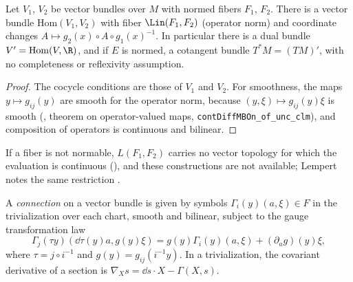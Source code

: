 \begin{theorem}
  \label{thm:hom-bundle}
  \leanok
  Let $V_1$, $V_2$ be vector bundles over $M$ with normed fibers $F_1$, $F_2$. There is a vector
  bundle $\mathrm{Hom}(V_1, V_2)$ with fiber $\Lin(F_1, F_2)$ (operator norm) and coordinate
  changes $A \mapsto g_2(x) \circ A \circ g_1(x)^{-1}$. In particular there is a dual bundle
  $V' = \mathrm{Hom}(V, \R)$, and if $E$ is normed, a cotangent bundle $T^*M = (TM)'$, with
  no completeness or reflexivity assumption.
\end{theorem}

\begin{proof}
  \leanok
  The cocycle conditions are those of $V_1$ and $V_2$. For smoothness, the maps
  $y \mapsto g_{ij}(y)$ are smooth for the operator norm, because $(y, \xi) \mapsto g_{ij}(y)\xi$
  is smooth (\cite{LCA}, theorem on operator-valued maps, \texttt{contDiffMBOn\_of\_unc\_clm}),
  and composition of operators is continuous and bilinear.
\end{proof}

If a fiber is not normable, $L(F_1, F_2)$ carries no vector topology for which the evaluation is
continuous (\cite[Satz 1 and its footnote]{Mai63}), and these constructions are not available;
Lempert notes the same restriction
\cite[\S2, p.~488]{Lem98}.

\begin{definition}
  \label{def:bundle-connection}
  \leanok
  A \emph{connection} on a vector bundle is given by symbols $\Gamma_i(y)(a, \xi) \in F$ in the
  trivialization over each chart, smooth and bilinear, subject to the gauge transformation law
  \[
    \Gamma_j(\tau y)(\dd\tau(y) a, g(y)\xi) = g(y)\Gamma_i(y)(a, \xi) + (\partial_a g)(y)\xi,
  \]
  where $\tau = j \circ i^{-1}$ and $g(y) = g_{ij}(i^{-1} y)$. In a trivialization, the covariant
  derivative of a section is $\nabla_X s = \dd s \cdot X - \Gamma(X, s)$.
\end{definition}

